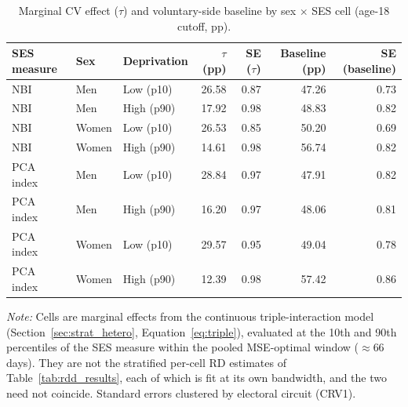 \begin{table}
\caption{Marginal CV effect ($\tau$) and voluntary-side baseline by sex $\times$ SES cell (age-18 cutoff, pp).}
\label{tab:triple_cells_T18}
\begin{tabular}{lllrrrr}
\toprule
SES measure & Sex & Deprivation & $\tau$ (pp) & SE ($\tau$) & Baseline (pp) & SE (baseline) \\
\midrule
NBI & Men & Low (p10) & 26.58 & 0.87 & 47.26 & 0.73 \\
NBI & Men & High (p90) & 17.92 & 0.98 & 48.83 & 0.82 \\
NBI & Women & Low (p10) & 26.53 & 0.85 & 50.20 & 0.69 \\
NBI & Women & High (p90) & 14.61 & 0.98 & 56.74 & 0.82 \\
PCA index & Men & Low (p10) & 28.84 & 0.97 & 47.91 & 0.82 \\
PCA index & Men & High (p90) & 16.20 & 0.97 & 48.06 & 0.81 \\
PCA index & Women & Low (p10) & 29.57 & 0.95 & 49.04 & 0.78 \\
PCA index & Women & High (p90) & 12.39 & 0.98 & 57.42 & 0.86 \\
\bottomrule
\end{tabular}
\par\vspace{0.6em}
{\footnotesize\begin{minipage}{\linewidth}\emph{Note:} Cells are marginal effects from the continuous triple-interaction model (Section~\ref{sec:strat_hetero}, Equation~\ref{eq:triple}), evaluated at the 10th and 90th percentiles of the SES measure within the pooled MSE-optimal window ($\approx$66 days). They are not the stratified per-cell RD estimates of Table~\ref{tab:rdd_results}, each of which is fit at its own bandwidth, and the two need not coincide. Standard errors clustered by electoral circuit (CRV1).\end{minipage}}
\end{table}
